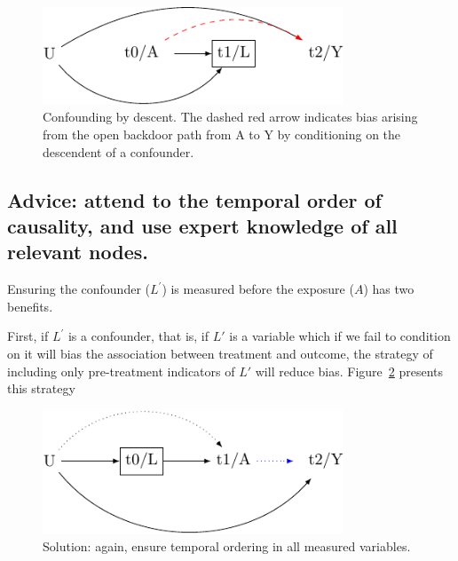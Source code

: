 \documentclass[
  singlecolumn]{report}
\begin{document}
\begin{figure}

{\centering \includegraphics[width=0.8\textwidth,height=\textheight]{causal-dags_files/figure-pdf/fig-dag-descendent-1.pdf}

}

\caption{\label{fig-dag-descendent}Confounding by descent. The dashed
red arrow indicates bias arising from the open backdoor path from A to Y
by conditioning on the descendent of a confounder.}

\end{figure}

\hypertarget{advice-attend-to-the-temporal-order-of-causality-and-use-expert-knowledge-of-all-relevant-nodes.}{%
\subsection{Advice: attend to the temporal order of causality, and use
expert knowledge of all relevant
nodes.}\label{advice-attend-to-the-temporal-order-of-causality-and-use-expert-knowledge-of-all-relevant-nodes.}}

Ensuring the confounder (\(L^\prime\)) is measured before the exposure
(\(A\)) has two benefits.

First, if \(L^\prime\) is a confounder, that is, if \(L\prime\) is a
variable which if we fail to condition on it will bias the association
between treatment and outcome, the strategy of including only
pre-treatment indicators of \(L\prime\) will reduce bias.
Figure~\ref{fig-dag-descendent-solution} presents this strategy

\begin{figure}

{\centering \includegraphics[width=0.8\textwidth,height=\textheight]{causal-dags_files/figure-pdf/fig-dag-descendent-solution-1.pdf}

}

\caption{\label{fig-dag-descendent-solution}Solution: again, ensure
temporal ordering in all measured variables.}

\end{figure}
\end{document}
